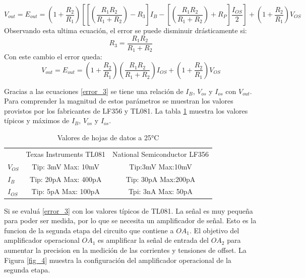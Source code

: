 \begin{equation} V_{out} = E_{out} = (1+\frac{R_2}{R_1})[[(\frac{R_1R_2}{R_1+R_2})-R_3]I_B - [(\frac{R_1R_2}{R_1+R_2})+R_P]\frac {I_{OS}}{2}] + (1+\frac{R_2}{R_1})V_{OS} \end{equation}
    Observando esta ultima ecuación, el error se puede disminuir drásticamente si:
\begin{equation} R_3 = \frac{R_1R_2}{R_1+R_2} \label{arreglo_1}\end{equation}
Con este cambio el error queda:
\begin{equation} V_{out} = E_{out} = (1+\frac{R_2}{R_1})(\frac{R_1R_2}{R_1+R_2})I_{OS} + (1+\frac{R_2}{R_1})V_{OS}  \label{error_3}\end{equation}


Gracias a las ecuaciones \ref{error_3} se tiene una relación  de $I_B$, $V_{os}$ y $I_{os}$ con $V_{out}$. Para comprender la magnitud de estos parámetros se muestran los valores provistos por los fabricantes
de LF356 y TL081. La tabla \ref{hoja_datos} muestra los valores típicos y máximos de $I_B$, $V_{os}$ y $I_{os}$.

\begin{table}[h!]
    \centering
    \caption{Valores de hojas de datos a 25°C}
    \label{hoja_datos}

    \begin{tabular}{@{}lcc@{}}
    & \multicolumn{1}{l}{Texas Instruments TL081} & \multicolumn{1}{r}{National Semiconductor LF356} \\
    \textbf{$V_{OS}$} & Tip: 3mV Max: 10mV      & Tip:3mV Max:10mV             \\
    \textbf{$I_B$}  & Tip: 20pA Max: 400pA    & Tip: 30pA Max:200pA          \\
    \textbf{$I_{OS}$} & Tip: 5pA Max: 100pA     & Tpi: 3nA Max: 50pA          
    \end{tabular}
    \end{table}

    

Si se evaluá \ref{error_3} con los valores típicos de TL081. La señal es muy pequeña para poder ser medida, por lo que se necesita un amplificador de señal. Esto es la funcion de la segunda etapa del circuito que contiene a 
$OA_1$. El objetivo del amplificador operacional $OA_1$ es amplificar la señal de entrada del $OA_2$ para aumentar la precision en la medición de las corrientes y tensiones de offset. La Figura \ref{fig_4} muestra la configuración del amplificador operacional de la segunda etapa.

